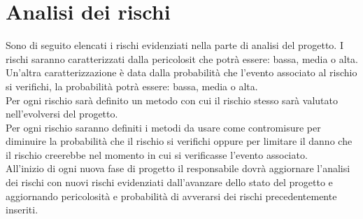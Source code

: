\section{Analisi dei rischi}{
Sono di seguito elencati i rischi evidenziati nella parte di analisi del progetto. 
I rischi saranno caratterizzati dalla pericolosit che potrà essere: bassa, media o alta.
Un'altra caratterizzazione è data dalla probabilità che l'evento associato al rischio si verifichi, la probabilità potrà essere: bassa, media o alta.\\
Per ogni rischio sarà definito un metodo con cui il rischio stesso sarà valutato nell'evolversi del progetto.\\
Per ogni rischio saranno definiti i metodi da usare come contromisure per diminuire la probabilità che il rischio si verifichi oppure per limitare il danno che il rischio creerebbe nel momento in cui si verificasse l'evento associato.\\
All'inizio di ogni nuova fase di progetto il responsabile dovrà aggiornare l'analisi dei rischi con nuovi rischi evidenziati dall'avanzare dello stato del progetto e aggiornando pericolosità e probabilità di avverarsi dei rischi precedentemente inseriti.

}

